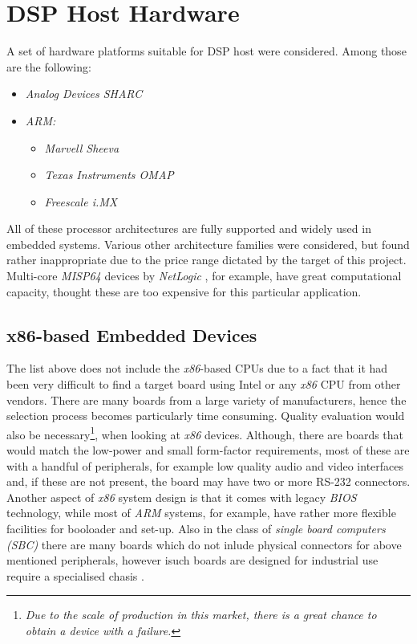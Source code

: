 \section{DSP Host Hardware}

  A set of hardware platforms suitable for DSP host were considered.
 Among those are the following:
 	\begin{itemize}
		\item \emph{Analog Devices SHARC}
		\item \emph{ARM:} \begin{itemize}
		\item \emph{Marvell Sheeva}
		\item \emph{Texas Instruments OMAP}
		\item \emph{Freescale i.MX}
		\end{itemize}
	\end{itemize}
 All of these processor architectures are fully supported and widely
 used in embedded systems. Various other architecture families were
 considered, but found rather inappropriate due to the price range
 dictated by the target of this project. Multi-core \emph{MISP64}
 devices by \emph{NetLogic} \cite{netlogic:mips64:multicore}, for
 example, have great computational capacity, thought these are too
 expensive for this particular application.

\subsection{x86-based Embedded Devices}

  The list above does not include the \emph{x86}-based CPUs due to a
 fact that it had been very difficult to find a target board using
 Intel or any \emph{x86} CPU from other vendors. There are many boards
 from a large variety of manufacturers, hence the selection process
 becomes particularly time consuming. Quality evaluation would also
 be necessary\footnote{\emph{Due to the scale of production in this
 market, there is a great chance to obtain a device with a failure.}},
 when looking at \emph{x86} devices. Although, there are boards that
 would match the low-power and small form-factor requirements, most
 of these are with a handful of peripherals, for example low quality
 audio and video interfaces and, if these are not present, the board
 may have two or more RS-232 connectors. Another aspect of \emph{x86}
 system design is that it comes with legacy \emph{BIOS} technology,
 while most of \emph{ARM} systems, for example, have rather more
 flexible facilities for booloader and set-up. Also in the class of
 \emph{single board computers (SBC)} there are many boards which do
 not inlude physical connectors for above mentioned peripherals,
 however isuch boards are designed for industrial use require a
 specialised chasis \cite{links:linuxfordevices:guide}.

